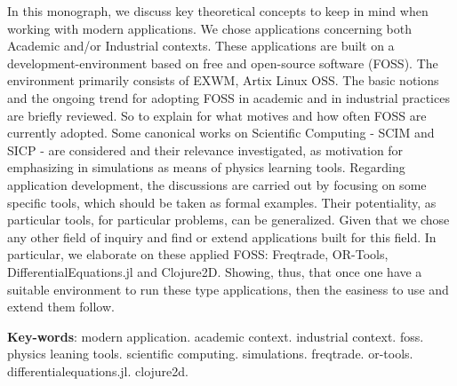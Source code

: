 \documentclass[
12pt,				%
openright,			%
oneside,			%
a4paper,			%
brazil,				%
english,			%
]{abntex2}
\begin{document}
\setlength{\absparsep}{18pt} %
\begin{resumo}
In this monograph, we discuss key theoretical concepts to keep in mind
when working with modern applications. We chose applications
concerning both Academic and/or Industrial contexts. These
applications are built on a development-environment based on free and
open-source software (FOSS). The environment primarily consists of EXWM, Artix Linux OSS.
The basic notions and the ongoing trend for adopting FOSS in
academic and in industrial practices are briefly reviewed. So to explain for
what motives and how often FOSS are currently adopted.
Some canonical works on Scientific Computing - SCIM and SICP - are
considered and their relevance investigated, as motivation for
emphasizing in simulations as means of physics learning tools. 
Regarding application development, the discussions are carried out by
focusing on some specific tools, which should be taken as formal
examples. Their potentiality, as particular tools, for particular
problems, can be generalized. Given that we chose any other field of
inquiry and find or extend applications built for this field.
In particular, we elaborate on these applied FOSS: Freqtrade, OR-Tools,
DifferentialEquations.jl and Clojure2D. Showing, thus, that once one have a
suitable environment to run these type applications, then the easiness to use
and extend them follow.

\textbf{Key-words}: modern application. academic context. industrial
context. foss. physics leaning tools. scientific
computing. simulations. freqtrade. or-tools. differentialequations.jl. clojure2d.
\end{resumo}
\end{document}
